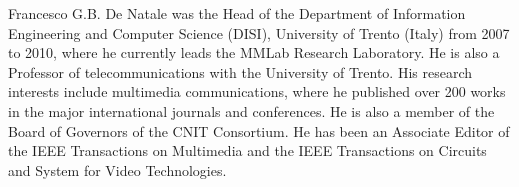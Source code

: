 \documentclass{ieeeaccess}
\begin{document}
\begin{IEEEbiography}{Francesco G.B. De Natale} was the Head of the Department of Information Engineering and Computer Science (DISI), University of Trento (Italy) from 2007 to 2010, where he currently leads the MMLab Research Laboratory. He is also a Professor of telecommunications with the University of Trento. His research interests include multimedia communications, where he published over 200 works in the major international journals and conferences. He is also a member of the Board of Governors of the CNIT Consortium. He has been an Associate Editor of the IEEE Transactions on Multimedia and the IEEE Transactions on Circuits and System for Video Technologies.
\end{IEEEbiography}

\EOD
\end{document}
